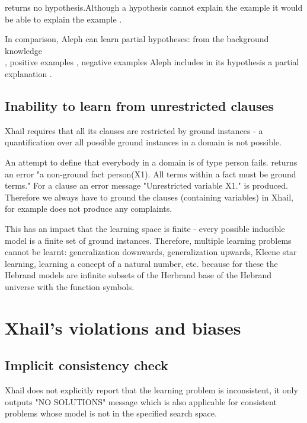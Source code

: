 returns no hypothesis.Although a hypothesis
 cannot explain the example  it would be able to explain the example .

In comparison, Aleph can learn partial hypotheses: from the background knowledge\\
, positive examples , negative examples  Aleph includes in its hypothesis a partial explanation
.

\subsection{Inability to learn from unrestricted clauses}\label{xhail_inability_to_learn_from_unrestricted_clauses}
Xhail requires that all its clauses are restricted by ground instances - a quantification over all possible ground instances in a domain is not possible.

An attempt to define that everybody in a domain is of type person fails.  returns an error "a non-ground fact person(X1). All terms within a fact must be ground terms." For a clause  an error message "Unrestricted variable X1." is produced. Therefore we always have to ground the clauses (containing variables) in Xhail, for example
 does not produce any complaints.

This has an impact that the learning space is finite - every possible inducible model is a finite set of ground instances. Therefore, multiple learning problems cannot be learnt: generalization downwards, generalization upwards, Kleene star learning, learning a concept of a natural number, etc. because for these the Hebrand models are infinite subsets of the Herbrand base of the Hebrand universe with the function symbols.

\section{Xhail's violations and biases}

\subsection{Implicit consistency check}\label{xhail_implicit_consistency_check}
Xhail does not explicitly report that the learning problem is inconsistent, it only outputs "NO SOLUTIONS" message which is also applicable for consistent problems whose model is not in the specified search space.

